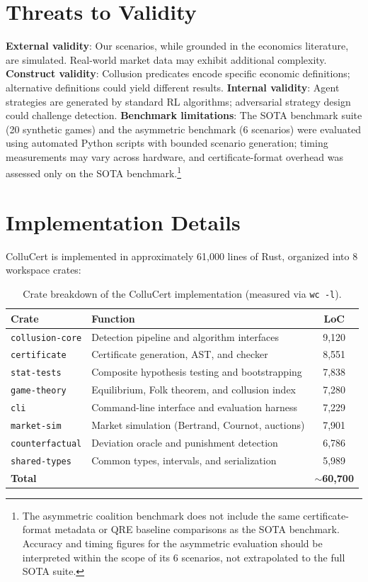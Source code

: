 \documentclass[11pt]{article}
\begin{document}
\section{Threats to Validity}
\label{sec:threats}

\textbf{External validity}: Our scenarios, while grounded in the economics literature, are simulated. Real-world market data may exhibit additional complexity. \textbf{Construct validity}: Collusion predicates encode specific economic definitions; alternative definitions could yield different results. \textbf{Internal validity}: Agent strategies are generated by standard RL algorithms; adversarial strategy design could challenge detection. \textbf{Benchmark limitations}: The SOTA benchmark suite (20 synthetic games) and the asymmetric benchmark (6 scenarios) were evaluated using automated Python scripts with bounded scenario generation; timing measurements may vary across hardware, and certificate-format overhead was assessed only on the SOTA benchmark.\footnote{The asymmetric coalition benchmark does not include the same certificate-format metadata or QRE baseline comparisons as the SOTA benchmark. Accuracy and timing figures for the asymmetric evaluation should be interpreted within the scope of its 6 scenarios, not extrapolated to the full SOTA suite.}

\section{Implementation Details}
\label{sec:impl}

ColluCert is implemented in approximately 61,000 lines of Rust, organized into 8 workspace crates:

\begin{table}[t]
\centering
\caption{Crate breakdown of the ColluCert implementation (measured via \texttt{wc -l}).}
\begin{tabular}{llc}
\toprule
\textbf{Crate} & \textbf{Function} & \textbf{LoC} \\
\midrule
\texttt{collusion-core} & Detection pipeline and algorithm interfaces & 9,120 \\
\texttt{certificate} & Certificate generation, AST, and checker & 8,551 \\
\texttt{stat-tests} & Composite hypothesis testing and bootstrapping & 7,838 \\
\texttt{game-theory} & Equilibrium, Folk theorem, and collusion index & 7,280 \\
\texttt{cli} & Command-line interface and evaluation harness & 7,229 \\
\texttt{market-sim} & Market simulation (Bertrand, Cournot, auctions) & 7,901 \\
\texttt{counterfactual} & Deviation oracle and punishment detection & 6,786 \\
\texttt{shared-types} & Common types, intervals, and serialization & 5,989 \\
\midrule
\textbf{Total} & & \textbf{${\sim}$60,700} \\
\bottomrule
\end{tabular}
\end{table}
\end{document}

